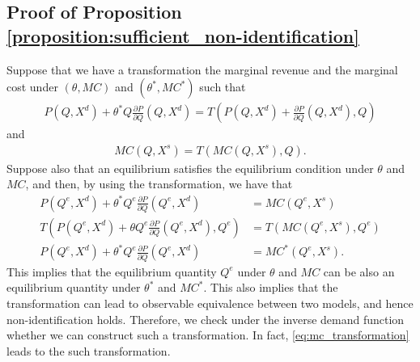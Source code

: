 \documentclass[11pt, a4paper]{article}
\theoremstyle{remark}
\begin{document}
\subsection{Proof of Proposition \ref{proposition:sufficient_non-identification}}
Suppose that we have a transformation the marginal revenue and the marginal cost under $(\theta, MC)$ and $(\theta^{*}, MC^{*})$ such that
\begin{align}
    P(Q, X^{d}) + \theta^{*} Q \frac{\partial P}{\partial Q}(Q, X^{d}) = T\left(P(Q, X^{d}) + \frac{\partial P}{\partial Q}(Q, X^{d}), Q\right)
\end{align}
and
\begin{align}
    MC(Q, X^{s}) = T\left(MC(Q, X^{s}), Q\right).
\end{align}
Suppose also that an equilibrium satisfies the equilibrium condition under $\theta$ and $MC$, and then, by using the transformation, we have that
\begin{align}
    P(Q^e, X^{d}) + \theta^{*} Q^e \frac{\partial P}{\partial Q}(Q^e, X^{d}) & = MC(Q^e, X^{s})\\
    T\left(P(Q^e, X^{d}) + \theta Q^e \frac{\partial P}{\partial Q}(Q^e, X^{d}), Q^e\right)&= T\left(MC(Q^e, X^{s}), Q^e\right)\\
    P(Q^e, X^{d}) + \theta^{*} Q^e \frac{\partial P}{\partial Q}(Q^e, X^{d})&= MC^{*}(Q^e, X^{s}).
\end{align}
This implies that the equilibrium quantity $Q^e$ under $\theta$ and $MC$ can be also an equilibrium quantity under $\theta^{*}$ and $MC^{*}$.
This also implies that the transformation can lead to observable equivalence between two models, and hence non-identification holds.
Therefore, we check under the inverse demand function whether we can construct such a transformation.
In fact,  \eqref{eq:mc_transformation} leads to the such transformation.
\end{document}
